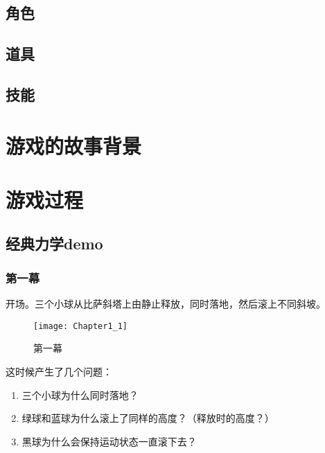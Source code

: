 \documentclass{tstextbook}
\begin{document}
\section{角色}


\section{道具}


\section{技能}

\chapter{游戏的故事背景}

\begin{summary}

\end{summary}

\chapter{游戏过程}

\begin{summary}

\end{summary}

\section{经典力学demo}

\subsection{第一幕}

开场。三个小球从比萨斜塔上由静止释放，同时落地，然后滚上不同斜坡。

\begin{figure}[H]
\centering 
\texttt{[image: Chapter1\_1]} 
\caption{第一幕} 
\label{1.1} 
\end{figure}

这时候产生了几个问题：

\begin{enumerate}
\item{三个小球为什么同时落地？}
\item{绿球和蓝球为什么滚上了同样的高度？（释放时的高度？）}
\item{黑球为什么会保持运动状态一直滚下去？}
\end{enumerate}
\end{document}

